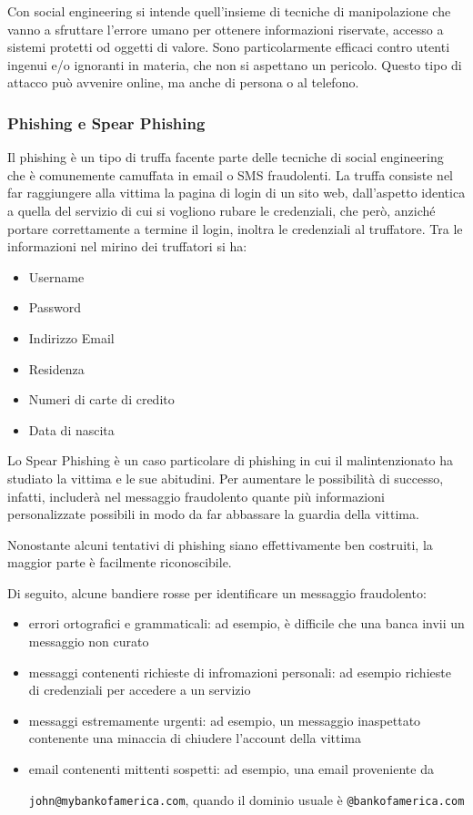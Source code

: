 Con social engineering si intende quell'insieme di tecniche di manipolazione che vanno a sfruttare l'errore umano per ottenere informazioni riservate, accesso a sistemi protetti od oggetti di valore. Sono particolarmente efficaci contro utenti ingenui e/o ignoranti in materia, che non si aspettano un pericolo. Questo tipo di attacco può avvenire online, ma anche di persona o al telefono.

\subsubsection{Phishing e Spear Phishing}

Il phishing è un tipo di truffa facente parte delle tecniche di social engineering che è comunemente camuffata in email o SMS fraudolenti. La truffa consiste nel far raggiungere alla vittima la pagina di login di un sito web, dall'aspetto identica a quella del servizio di cui si vogliono rubare le credenziali, che però, anziché portare correttamente a termine il login, inoltra le credenziali al truffatore.
Tra le informazioni nel mirino dei truffatori si ha:
\begin{itemize}
    \item Username
    \item Password
    \item Indirizzo Email
    \item Residenza
    \item Numeri di carte di credito
    \item Data di nascita
\end{itemize}

Lo Spear Phishing è un caso particolare di phishing in cui il malintenzionato ha studiato la vittima e le sue abitudini. Per aumentare le possibilità di successo, infatti, includerà nel messaggio fraudolento quante più informazioni personalizzate possibili in modo da far abbassare la guardia della vittima.

Nonostante alcuni tentativi di phishing siano effettivamente ben costruiti, la maggior parte è facilmente riconoscibile.

Di seguito, alcune bandiere rosse per identificare un messaggio fraudolento:

\begin{itemize}
    \item errori ortografici e grammaticali: ad esempio, è difficile che una banca invii un messaggio non curato
    \item messaggi contenenti richieste di infromazioni personali: ad esempio richieste di credenziali per accedere a un servizio
    \item messaggi estremamente urgenti: ad esempio, un messaggio inaspettato contenente una minaccia di chiudere l'account della vittima
    \item email contenenti mittenti sospetti: ad esempio, una email proveniente da

          \texttt{john@mybankofamerica.com}, quando il dominio usuale è \texttt{@bankofamerica.com}
\end{itemize}

